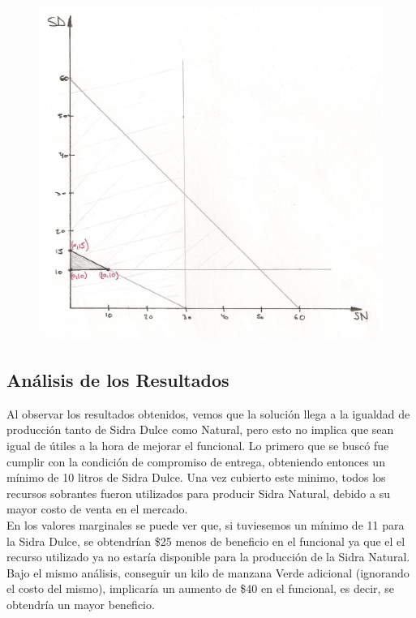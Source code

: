 \documentclass[a4paper,10pt]{article}
\begin{document}
\begin{figure}[ht!]
\centering
\includegraphics[scale=0.6]{graficoModelos.jpg}
\end{figure}


\subsection{An\'alisis de los Resultados}

Al observar los resultados obtenidos, vemos que la soluci\'on llega a la igualdad de producci\'on tanto de Sidra Dulce como Natural, pero esto no implica que sean igual de \'utiles a la hora de mejorar el funcional. Lo primero que se busc\'o fue cumplir con la condici\'on de compromiso de entrega, obteniendo entonces un m\'inimo de 10 litros de Sidra Dulce. Una vez cubierto este minimo, todos los recursos sobrantes fueron utilizados para producir Sidra Natural, debido a su mayor costo de venta en el mercado.\\

En los valores marginales se puede ver que, si tuviesemos un m\'inimo de 11 para la Sidra Dulce, se obtendr\'ian \$25 menos de beneficio en el funcional ya que el el recurso utilizado ya no estar\'ia disponible para la producci\'on de la Sidra Natural. Bajo el mismo an\'alisis, conseguir un kilo de manzana Verde adicional (ignorando el costo del mismo), implicar\'ia un aumento de \$40 en el funcional, es decir, se obtendr\'ia un mayor beneficio.
\end{document}
